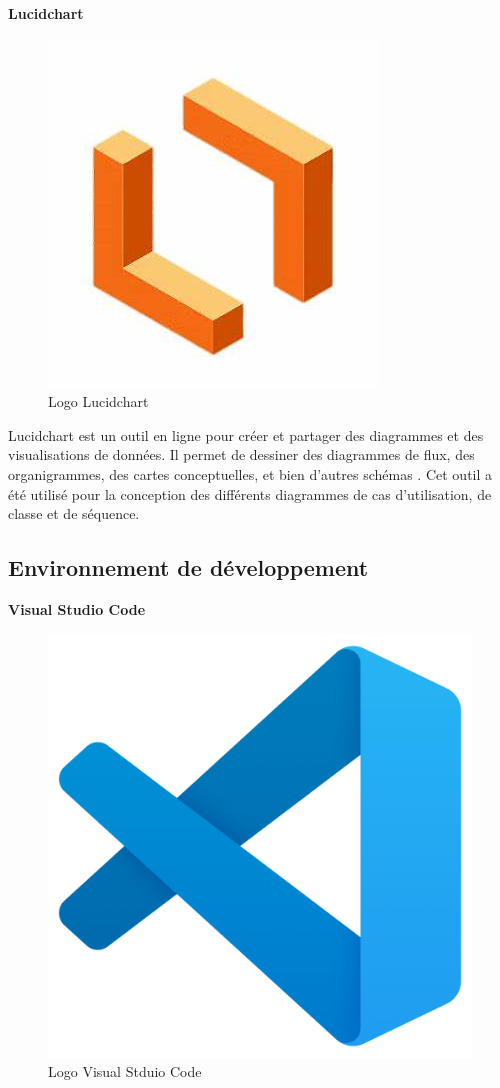 \large 
\textbf{Lucidchart}
\begin{figure}[htbp]
   \centering
   \includegraphics[scale=0.2]{Images/lucid.jpeg} 
   \caption{Logo Lucidchart}
   \label{fig:lucid}
\end{figure}

Lucidchart est un outil en ligne pour créer et partager des 
diagrammes et des visualisations de données. Il permet de 
dessiner des diagrammes de flux, des organigrammes, des cartes 
conceptuelles, et bien d'autres schémas \cite{LucidChart}. Cet outil a été utilisé pour
la conception des différents diagrammes de cas d'utilisation, de classe et de séquence.

\subsection{Environnement de développement}
\large 
\textbf{Visual Studio Code}

\begin{figure}[htbp]
   \centering
   \includegraphics[scale=0.06]{Images/vs.png} 
   \caption{Logo Visual Stduio Code}
   \label{fig:vscode}
\end{figure}

